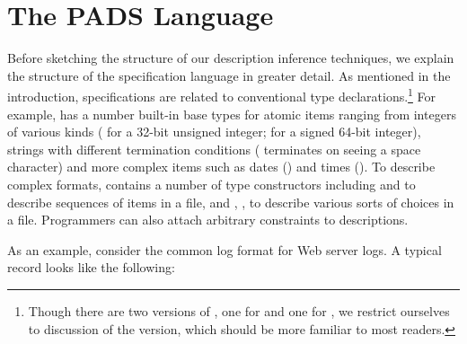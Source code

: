 \documentclass{article}
\begin{document}
\section*{The PADS Language}
Before sketching the structure of our description inference techniques,
we explain the structure of the \pads{} specification language in greater
detail.  
As mentioned in the introduction,
\pads{} specifications are related to conventional type 
declarations.\footnote{Though there are two versions of \pads{},
one for \C{} and
one for \ocaml{}, we restrict ourselves to discussion of the \C{} version,
which should be more familiar to most readers.}  For example,
\pads{} has a number built-in base types for atomic items ranging
from integers of various kinds ( for a 32-bit unsigned integer;
 for a signed 64-bit integer), strings with different
termination conditions ( terminates on seeing a
space character) and more complex items such as 
 dates () and times ().
To describe complex formats, \pads{} contains a number of type constructors
including  and  to describe sequences
of items in a file, and , ,  to 
describe various sorts of choices in a file.  Programmers
can also attach arbitrary constraints to descriptions.

As an example, consider the common log format for Web server logs.  A
typical record looks like the following:
\end{document}
